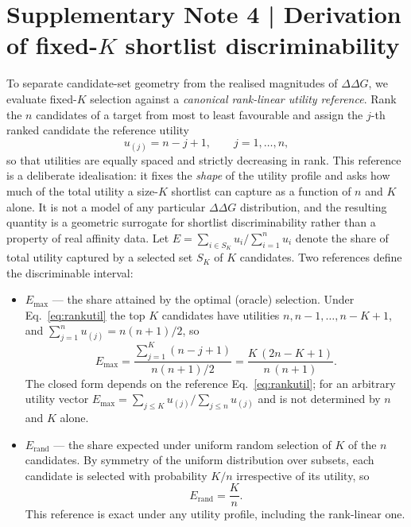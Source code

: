 \documentclass[11pt,a4paper]{article}
\begin{document}
\section*{Supplementary Note 4 | Derivation of fixed-$K$ shortlist discriminability}
To separate candidate-set geometry from the realised magnitudes of $\Delta\Delta G$, we
evaluate fixed-$K$ selection against a \emph{canonical rank-linear utility reference}.
Rank the $n$ candidates of a target from most to least favourable and assign the $j$-th
ranked candidate the reference utility
\begin{equation}
  u_{(j)} = n - j + 1, \qquad j = 1,\dots,n,
  \label{eq:rankutil}
\end{equation}
so that utilities are equally spaced and strictly decreasing in rank. This reference is a
deliberate idealisation: it fixes the \emph{shape} of the utility profile and asks how much
of the total utility a size-$K$ shortlist can capture as a function of $n$ and $K$ alone.
It is not a model of any particular $\Delta\Delta G$ distribution, and the resulting
quantity is a geometric surrogate for shortlist discriminability rather than a property of
real affinity data. Let $E = \sum_{i \in S_K} u_i / \sum_{i=1}^{n} u_i$ denote the share of
total utility captured by a selected set $S_K$ of $K$ candidates. Two references define the
discriminable interval:
\begin{itemize}
  \item $E_{\max}$ --- the share attained by the optimal (oracle) selection. Under
        Eq.~\eqref{eq:rankutil} the top $K$ candidates have utilities
        $n, n-1, \dots, n-K+1$, and $\sum_{j=1}^{n} u_{(j)} = n(n+1)/2$, so
        \begin{equation}
          E_{\max} = \frac{\sum_{j=1}^{K}(n-j+1)}{n(n+1)/2}
                    = \frac{K\,(2n-K+1)}{n\,(n+1)} .
          \label{eq:emax}
        \end{equation}
        The closed form depends on the reference Eq.~\eqref{eq:rankutil}; for an arbitrary
        utility vector $E_{\max} = \sum_{j\le K} u_{(j)} / \sum_{j\le n} u_{(j)}$ and is
        not determined by $n$ and $K$ alone.
  \item $E_{\mathrm{rand}}$ --- the share expected under uniform random selection of $K$ of the
        $n$ candidates. By symmetry of the uniform distribution over subsets, each candidate
        is selected with probability $K/n$ irrespective of its utility, so
        \begin{equation}
          E_{\mathrm{rand}} = \frac{K}{n} .
          \label{eq:erand}
        \end{equation}
        This reference is exact under any utility profile, including the rank-linear one.
\end{itemize}
\end{document}
